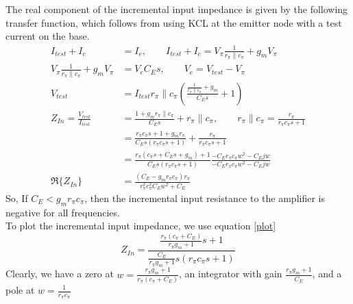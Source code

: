 \documentclass{article}
\begin{document}
\section{}
The real component of the incremental input impedance is given by the following transfer
 function, which follows from using KCL at the emitter node with a test current on the base.
\begin{align*}
I_{test} + I_c &= I_e, \qquad I_{test}+I_c = V_\pi\frac{1}{r_\pi\|c_\pi} + g_mV_\pi \\
V_\pi\frac{1}{r_\pi\|c_\pi} + g_mV_\pi &= V_eC_Es ,\qquad  V_e = V_{test}-V_\pi \\
V_{test} &= I_{test}r_\pi\|c_\pi(\frac{\frac{1}{r_\pi\|c_\pi}+g_m}{C_Es}+1) \\
Z_{In} = \frac{V_{test}}{I_{test}} &= 
	\frac{1+g_m r_\pi \| c_\pi}{C_E s} + r_\pi \| c_\pi, \qquad
	r_\pi \| c_\pi = \frac{r_\pi}{r_\pi c_\pi s + 1} \\
 &= \frac{r_\pi c_\pi s+1+g_m r_\pi}{C_E s(r_\pi c_\pi s +1)} +
	\frac{r_\pi}{r_\pi c_\pi s + 1} \\
 &= \frac{r_\pi(c_\pi s+C_E s+ g_m)+1}{C_E s(r_\pi c_\pi s+1)}
	\frac{-C_E r_\pi c_\pi w^2 - C_Ejw}
	{-C_E r_\pi c_\pi w^2 - C_Ejw} \tag{3} \label{plot}\\
\Re \{Z_{In}\} &= \frac{(C_E - g_m r_\pi c_\pi)r_\pi}
	{r_\pi^2c_\pi^2C_Ew^2+C_E} 
\end{align*}
So, If $C_E < g_m r_\pi c_\pi$, then the incremental input resistance to the amplifier is negative for all frequencies. \\
To plot the incremental input impedance, we use equation \eqref{plot} \\
$$
Z_{In} = \displaystyle\frac{\displaystyle\frac{r_\pi(c_\pi +C_E)}{r_\pi g_m + 1} s+1}
	{\displaystyle\frac{C_E}{r_\pi g_m +1} s(r_\pi c_\pi s+1)}
$$
Clearly, we have a zero at $w=\frac{r_\pi g_m + 1}{r_\pi(c_\pi +C_E)}$,
 an integrator with gain $\frac{r_\pi g_m +1}{C_E} $, and a pole at $w=\frac{1}{r_\pi c_\pi}$ 
\newpage{}
\end{document}

